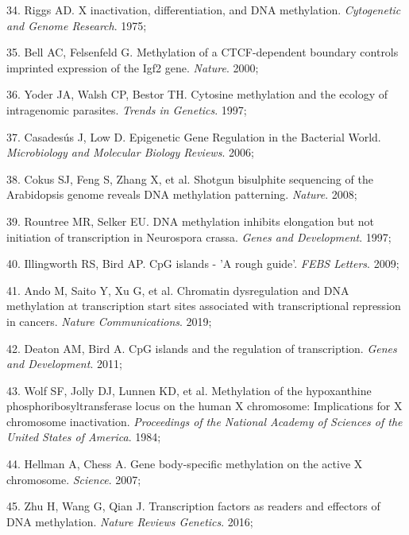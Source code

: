 \documentclass[11pt,twoside]{bristolthesis}
\newenvironment{cslreferences}%
  {}%
  {\par}
\begin{document}
\begin{cslreferences}
\leavevmode\hypertarget{ref-Riggs1975}{}%
34. Riggs AD. X inactivation, differentiation, and DNA methylation. \emph{Cytogenetic and Genome Research}. 1975;

\leavevmode\hypertarget{ref-Bell2000}{}%
35. Bell AC, Felsenfeld G. Methylation of a CTCF-dependent boundary controls imprinted expression of the Igf2 gene. \emph{Nature}. 2000;

\leavevmode\hypertarget{ref-Yoder1997}{}%
36. Yoder JA, Walsh CP, Bestor TH. Cytosine methylation and the ecology of intragenomic parasites. \emph{Trends in Genetics}. 1997;

\leavevmode\hypertarget{ref-Casadesus2006}{}%
37. Casadesús J, Low D. Epigenetic Gene Regulation in the Bacterial World. \emph{Microbiology and Molecular Biology Reviews}. 2006;

\leavevmode\hypertarget{ref-Cokus2008}{}%
38. Cokus SJ, Feng S, Zhang X, et al. Shotgun bisulphite sequencing of the Arabidopsis genome reveals DNA methylation patterning. \emph{Nature}. 2008;

\leavevmode\hypertarget{ref-Rountree1997}{}%
39. Rountree MR, Selker EU. DNA methylation inhibits elongation but not initiation of transcription in Neurospora crassa. \emph{Genes and Development}. 1997;

\leavevmode\hypertarget{ref-Illingworth2009}{}%
40. Illingworth RS, Bird AP. CpG islands - 'A rough guide'. \emph{FEBS Letters}. 2009;

\leavevmode\hypertarget{ref-Ando2019}{}%
41. Ando M, Saito Y, Xu G, et al. Chromatin dysregulation and DNA methylation at transcription start sites associated with transcriptional repression in cancers. \emph{Nature Communications}. 2019;

\leavevmode\hypertarget{ref-Deaton2011}{}%
42. Deaton AM, Bird A. CpG islands and the regulation of transcription. \emph{Genes and Development}. 2011;

\leavevmode\hypertarget{ref-Wolf1984}{}%
43. Wolf SF, Jolly DJ, Lunnen KD, et al. Methylation of the hypoxanthine phosphoribosyltransferase locus on the human X chromosome: Implications for X chromosome inactivation. \emph{Proceedings of the National Academy of Sciences of the United States of America}. 1984;

\leavevmode\hypertarget{ref-Hellman2007}{}%
44. Hellman A, Chess A. Gene body-specific methylation on the active X chromosome. \emph{Science}. 2007;

\leavevmode\hypertarget{ref-Zhu2016}{}%
45. Zhu H, Wang G, Qian J. Transcription factors as readers and effectors of DNA methylation. \emph{Nature Reviews Genetics}. 2016;


\end{cslreferences}
\end{document}

